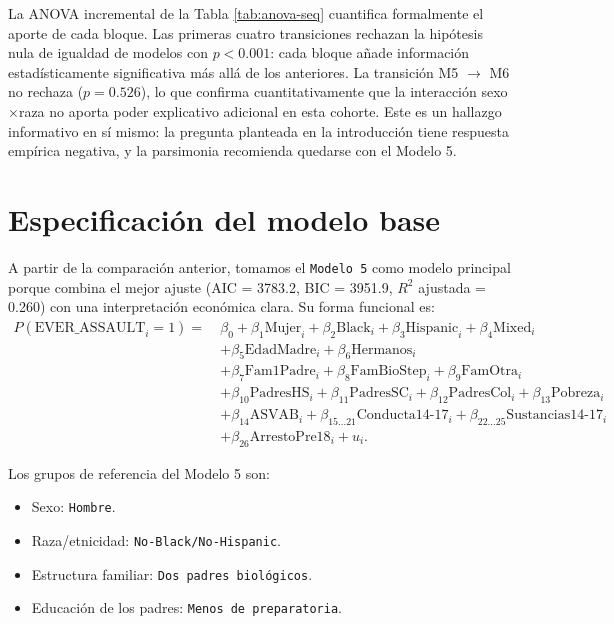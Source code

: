 \documentclass[11pt]{article}
\begin{document}
La ANOVA incremental de la Tabla \ref{tab:anova-seq} cuantifica formalmente el aporte de cada bloque. Las primeras cuatro transiciones rechazan la hipótesis nula de igualdad de modelos con $p<0.001$: cada bloque añade información estadísticamente significativa más allá de los anteriores. La transición M5 $\to$ M6 no rechaza ($p=0.526$), lo que confirma cuantitativamente que la interacción sexo$\times$raza no aporta poder explicativo adicional en esta cohorte. Este es un hallazgo informativo en sí mismo: la pregunta planteada en la introducción tiene respuesta empírica negativa, y la parsimonia recomienda quedarse con el Modelo 5.

\section{Especificación del modelo base}

A partir de la comparación anterior, tomamos el \texttt{Modelo 5} como modelo principal porque combina el mejor ajuste (AIC = 3783.2, BIC = 3951.9, $R^2$ ajustada = 0.260) con una interpretación económica clara. Su forma funcional es:
\[
\begin{aligned}
P(\text{EVER\_ASSAULT}_i = 1) =\ & \beta_0 + \beta_1 \text{Mujer}_i + \beta_2 \text{Black}_i + \beta_3 \text{Hispanic}_i + \beta_4 \text{Mixed}_i \\
& + \beta_5 \text{EdadMadre}_i + \beta_6 \text{Hermanos}_i \\
& + \beta_7 \text{Fam1Padre}_i + \beta_8 \text{FamBioStep}_i + \beta_9 \text{FamOtra}_i \\
& + \beta_{10} \text{PadresHS}_i + \beta_{11} \text{PadresSC}_i + \beta_{12} \text{PadresCol}_i + \beta_{13} \text{Pobreza}_i \\
& + \beta_{14} \text{ASVAB}_i + \beta_{15\ldots 21} \text{Conducta14-17}_i + \beta_{22\ldots 25} \text{Sustancias14-17}_i \\
& + \beta_{26} \text{ArrestoPre18}_i + u_i.
\end{aligned}
\]

Los grupos de referencia del Modelo 5 son:
\begin{itemize}
\item Sexo: \texttt{Hombre}.
\item Raza/etnicidad: \texttt{No-Black/No-Hispanic}.
\item Estructura familiar: \texttt{Dos padres biológicos}.
\item Educación de los padres: \texttt{Menos de preparatoria}.
\end{itemize}
\end{document}
